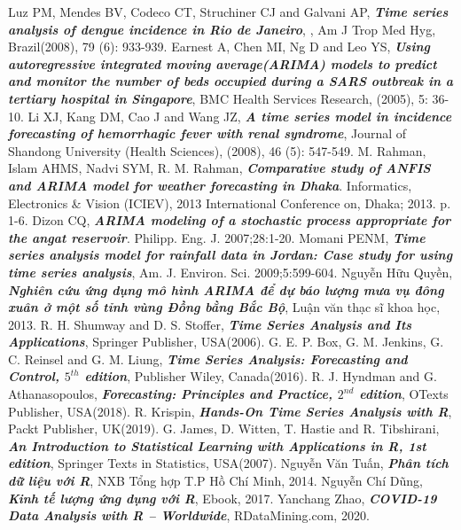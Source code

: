 \documentclass[12pt, a4paper,oneside]{book}
\theoremstyle{definition}
\begin{document}
\begin{thebibliography}{99}
		 Luz PM, Mendes BV, Codeco CT, Struchiner CJ and Galvani AP, \textbf{\textit{Time series analysis of dengue incidence in Rio de Janeiro}}, , Am J Trop Med Hyg, Brazil(2008), 79 (6): 933-939.
	 Earnest A, Chen MI, Ng D and Leo YS, \textbf{\textit{Using autoregressive integrated moving average(ARIMA) models to predict and monitor the number of beds occupied during a SARS outbreak in a tertiary hospital in Singapore}}, BMC Health Services Research, (2005), 5: 36-10.
	  Li XJ, Kang DM, Cao J and Wang JZ, \textbf{\textit{A time series model in incidence forecasting of hemorrhagic fever with renal syndrome}}, Journal of Shandong University (Health Sciences), (2008), 46 (5): 547-549.
	 M. Rahman, Islam AHMS, Nadvi SYM, R. M. Rahman, \textit{\textbf{Comparative study of ANFIS and ARIMA model for weather forecasting in Dhaka}}. Informatics, Electronics \& Vision (ICIEV), 2013 International Conference on, Dhaka; 2013. p. 1-6.
	 Dizon CQ, \textit{\textbf{ARIMA modeling of a stochastic process appropriate for the angat reservoir}}. Philipp. Eng. J. 2007;28:1-20.
	 Momani PENM, \textit{\textbf{Time series analysis model for  rainfall data in Jordan: Case study for using time series analysis}}, Am. J. Environ. Sci. 2009;5:599-604.
	 Nguyễn Hữu Quyền, \textit{\textbf{Nghiên cứu ứng dụng mô hình ARIMA để dự báo lượng mưa vụ đông xuân ở một số tỉnh vùng Đồng bằng Bắc Bộ}}, Luận văn thạc sĩ khoa học, 2013.	
	 R. H. Shumway and D. S. Stoffer, \textbf{\textit{Time Series Analysis and Its Applications}}, Springer Publisher, USA(2006).
	 G. E. P. Box, G. M. Jenkins, G. C. Reinsel and G. M. Liung, \textbf{\textit{Time Series Analysis: Forecasting and Control, $5^{th}$ edition}}, Publisher Wiley, Canada(2016).
	 R. J. Hyndman and G. Athanasopoulos, \textbf{\textit{Forecasting: Principles and Practice, $2^{nd}$ edition}}, OTexts Publisher, USA(2018).
	 R. Krispin,  \textbf{\textit{Hands-On Time Series Analysis with R}}, Packt Publisher, UK(2019). 	
	 G. James, D. Witten, T. Hastie and R. Tibshirani, \textbf{\textit{An Introduction to Statistical Learning with Applications in R, 1st edition}}, Springer Texts in Statistics, USA(2007).
	 Nguyễn Văn Tuấn,  \textbf{\textit{Phân tích dữ liệu với R}}, NXB Tổng hợp T.P Hồ Chí Minh, 2014.
	 Nguyễn Chí Dũng, \textbf{\textit{Kinh tế lượng ứng dụng với R}}, Ebook, 2017.
	 Yanchang Zhao, \textbf{\textit{COVID-19 Data Analysis with R – Worldwide}}, RDataMining.com, 2020.	

\end{thebibliography}
\end{document}
